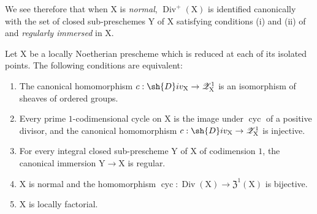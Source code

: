 \begin{env}[21.7.3.1]
\label{IV.21.7.3.1}
We see therefore that when $\mathrm{X}$ is \emph{normal}, $\operatorname{Div}^+(\mathrm{X})$ is identified canonically with the set of closed sub-preschemes $\mathrm{Y}$ of $\mathrm{X}$ satisfying conditions (i) and (ii) of  and \emph{regularly immersed} in $\mathrm{X}$.
\end{env}

\begin{proposition}[21.7.4]
\label{IV.21.7.4}
Let $\mathrm{X}$ be a locally Noetherian prescheme which is reduced at each of its isolated points.
The following conditions are equivalent:
\begin{enumerate}
  \item[\emph{a)}] The canonical homomorphism $c:\sh{D}iv_\mathrm{X}\to\mathscr{Z}_\mathrm{X}^1$  is an isomorphism of sheaves of ordered groups.
  \item[\emph{a$'$)}] Every prime $1$-codimensional cycle on $\mathrm{X}$ is the image under $\operatorname{cyc}$ of a positive divisor, and the canonical homomorphism $c:\sh{D}iv_\mathrm{X}\to\mathscr{Z}_\mathrm{X}^1$ is injective.
  \item[\emph{a$''$)}] For every integral closed sub-prescheme $\mathrm{Y}$ of $\mathrm{X}$ of codimension $1$, the canonical immersion $\mathrm{Y}\to\mathrm{X}$ is regular.
  \item[\emph{b)}] $\mathrm{X}$ is normal and the homomorphism $\operatorname{cyc}:\operatorname{Div}(\mathrm{X})\to\mathfrak{Z}^1(\mathrm{X})$ is bijective.
  \item[\emph{c)}] $\mathrm{X}$ is locally factorial.
\end{enumerate}
\end{proposition}

